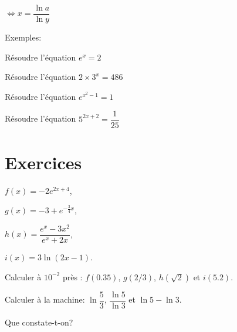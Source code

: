 \documentclass[a4paper,12pt]{scrartcl}
\begin{document}
$\Leftrightarrow x = \dfrac{\ln{a}}{\ln{y}}$


Exemples:

Résoudre l'équation $e^x = 2$


Résoudre l'équation $2 \times 3^x = 486$


Résoudre l'équation $e^{x^2-1} = 1$


Résoudre l'équation $5^{2x+2} = \dfrac{1}{25}$


\clearpage
\part*{Exercices}

\fiche{}


\begin{multicols}{2} 
$f(x) = -2 e^{2x+4}$, 

$g(x) = -3 + e^{-\frac{3}{4} x}$, 

$h(x) = \dfrac{e^x - 3x^2}{e^x + 2x}$, 

$i(x) = 3 \ln(2x-1)$.
\end{multicols}

Calculer à $10^{-2}$ près :	$f(0.35)$,  $g(2/3)$,  $h(\sqrt{2})$ et $i(5.2)$.

\exo[0]{}
Calculer à la machine: $\ln \dfrac{5}{3}$, $\dfrac{\ln 5}{\ln 3}$ et $\ln 5 - \ln 3$.

Que constate-t-on?


\begin{multicols}{3}















\end{multicols}
\end{document}
